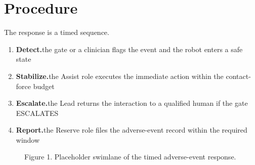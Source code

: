 \section{Procedure}
\label{sec:c}

The response is a timed sequence.

\begin{enumerate}[leftmargin=2.0em,itemsep=3pt]
\item \textbf{Detect.}\quad the gate or a clinician flags the event and the robot enters a safe state
\item \textbf{Stabilize.}\quad the Assist role executes the immediate action within the contact-force budget
\item \textbf{Escalate.}\quad the Lead returns the interaction to a qualified human if the gate ESCALATES
\item \textbf{Report.}\quad the Reserve role files the adverse-event record within the required window
\end{enumerate}

\begin{figure}[H]
  \centering
  \caption{Figure 1. Placeholder swimlane of the timed adverse-event response.}\label{fig:swimlane}
\end{figure}
